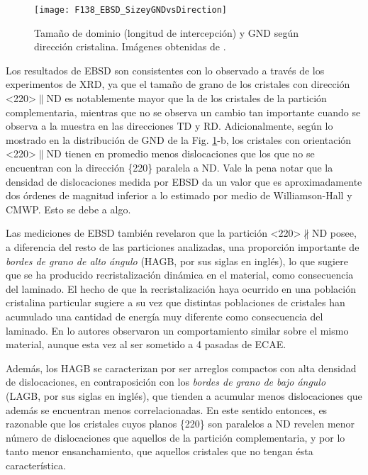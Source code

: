 \begin{figure}[!htb]
  \centering
  \texttt{[image: F138\_EBSD\_SizeyGNDvsDirection]}
  \caption{Tamaño de dominio (longitud de intercepción) y GND según dirección cristalina. Imágenes obtenidas de \cite{Devincentis2017}.}
  \label{fig:F138EBSDNati}
\end{figure}

Los resultados de EBSD son consistentes con lo observado a través de los experimentos de XRD, ya que el tamaño de grano de los cristales con dirección \textless220\textgreater$\parallel$ND es notablemente mayor que la de los cristales de la partición complementaria, mientras que no se observa un cambio tan importante cuando se observa a la muestra en las direcciones TD y RD.
Adicionalmente, según lo mostrado en la distribución de GND de la Fig. \ref{fig:F138EBSDNati}-b, los cristales con orientación \textless220\textgreater$\parallel$ND tienen en promedio menos dislocaciones que los que no se encuentran con la dirección \{220\} paralela a ND.
Vale la pena notar que la densidad de dislocaciones medida por EBSD da un valor que es aproximadamente dos órdenes de magnitud inferior a lo estimado por medio de Williamson-Hall y CMWP.
Esto se debe a algo.

Las mediciones de EBSD también revelaron que la partición \textless220\textgreater$\nparallel$ND posee, a diferencia del resto de las particiones analizadas, una proporción importante de \textit{bordes de grano de alto ángulo} (HAGB, por sus siglas en inglés), lo que sugiere que se ha producido recristalización dinámica en el material, como consecuencia del laminado.
El hecho de que la recristalización haya ocurrido en una población cristalina particular sugiere a su vez que distintas poblaciones de cristales han acumulado una cantidad de energía muy diferente como consecuencia del laminado.
En \cite{Devincentis2015} lo autores observaron un comportamiento similar sobre el mismo material, aunque esta vez al ser sometido a 4 pasadas de ECAE.

Además, los HAGB se caracterizan por ser arreglos compactos con alta densidad de dislocaciones, en contraposición con los \textit{bordes de grano de bajo ángulo} (LAGB, por sus siglas en inglés), que tienden a acumular menos dislocaciones que además se encuentran menos correlacionadas.
En este sentido entonces, es razonable que los cristales cuyos planos \{220\} son paralelos a ND revelen menor número de dislocaciones que aquellos de la partición complementaria, y por lo tanto menor ensanchamiento, que aquellos cristales que no tengan ésta característica.

